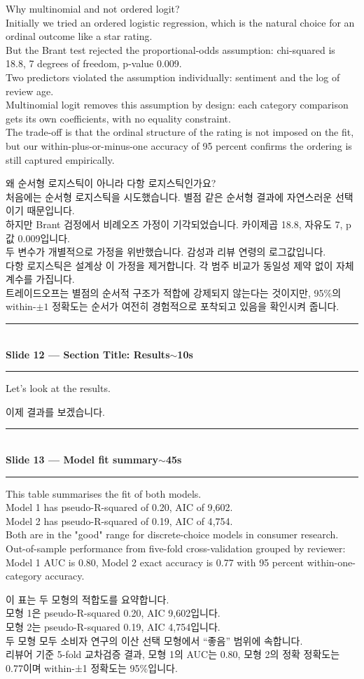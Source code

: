 \documentclass[10pt,a4paper]{article}
\newcommand{\sechead}[2]{%
  \vspace{6pt}%
  \noindent\rule{\linewidth}{0.6pt}\\[1pt]
  {\small\bfseries #1\hfill #2}\\[-3pt]
  \rule{\linewidth}{0.4pt}\par\vspace{2pt}%
}
\newcommand{\sent}[1]{#1\\[5pt]}
\newcommand{\bilingual}[2]{%
  \noindent%
  \begin{minipage}[t]{0.485\linewidth}
    \small #1
  \end{minipage}\hfill\vrule\hfill%
  \begin{minipage}[t]{0.483\linewidth}
    \small #2
  \end{minipage}\par\vspace{4pt}%
}
\begin{document}
\bilingual{%
\sent{Why multinomial and not ordered logit?}
\sent{Initially we tried an ordered logistic regression, which is the
natural choice for an ordinal outcome like a star rating.}
\sent{But the Brant test rejected the proportional-odds assumption:
chi-squared is 18.8, 7 degrees of freedom, p-value 0.009.}
\sent{Two predictors violated the assumption individually: sentiment and
the log of review age.}
\sent{Multinomial logit removes this assumption by design: each category
comparison gets its own coefficients, with no equality constraint.}
\sent{The trade-off is that the ordinal structure of the rating is not
imposed on the fit, but our within-plus-or-minus-one accuracy of 95
percent confirms the ordering is still captured empirically.}
}{%
\sent{왜 순서형 로지스틱이 아니라 다항 로지스틱인가요?}
\sent{처음에는 순서형 로지스틱을 시도했습니다. 별점 같은 순서형 결과에
자연스러운 선택이기 때문입니다.}
\sent{하지만 Brant 검정에서 비례오즈 가정이 기각되었습니다. 카이제곱
18.8, 자유도 7, p값 0.009입니다.}
\sent{두 변수가 개별적으로 가정을 위반했습니다. 감성과 리뷰 연령의
로그값입니다.}
\sent{다항 로지스틱은 설계상 이 가정을 제거합니다. 각 범주 비교가
동일성 제약 없이 자체 계수를 가집니다.}
\sent{트레이드오프는 별점의 순서적 구조가 적합에 강제되지 않는다는
것이지만, 95\%의 within-$\pm 1$ 정확도는 순서가 여전히 경험적으로
포착되고 있음을 확인시켜 줍니다.}
}

\sechead{Slide 12 --- Section Title: Results}{$\sim$10s}

\bilingual{%
\sent{Let's look at the results.}
}{%
\sent{이제 결과를 보겠습니다.}
}

\sechead{Slide 13 --- Model fit summary}{$\sim$45s}

\bilingual{%
\sent{This table summarises the fit of both models.}
\sent{Model 1 has pseudo-R-squared of 0.20, AIC of 9{,}602.}
\sent{Model 2 has pseudo-R-squared of 0.19, AIC of 4{,}754.}
\sent{Both are in the "good" range for discrete-choice models in
consumer research.}
\sent{Out-of-sample performance from five-fold cross-validation grouped
by reviewer: Model 1 AUC is 0.80, Model 2 exact accuracy is 0.77 with
95 percent within-one-category accuracy.}
}{%
\sent{이 표는 두 모형의 적합도를 요약합니다.}
\sent{모형 1은 pseudo-R-squared 0.20, AIC 9{,}602입니다.}
\sent{모형 2는 pseudo-R-squared 0.19, AIC 4{,}754입니다.}
\sent{두 모형 모두 소비자 연구의 이산 선택 모형에서 ``좋음'' 범위에
속합니다.}
\sent{리뷰어 기준 5-fold 교차검증 결과, 모형 1의 AUC는 0.80, 모형 2의
정확 정확도는 0.77이며 within-±1 정확도는 95\%입니다.}
}
\end{document}
